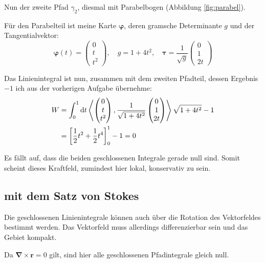 \documentclass[11pt, ngerman]{article}
\newcommand{\half}{\frac 12}
\newcommand{\inner}[2]{\left\langle #1, #2 \right\rangle}
\newcommand{\vnabla}{\vec \nabla}
\renewcommand{\vec}[1]{\boldsymbol{#1}}
\begin{document}
	Nun der zweite Pfad $\gamma_2$, diesmal mit Parabelbogen (Abbildung \ref{fig:parabel}).

	Für den Parabelteil ist meine Karte $\vec\varphi$, deren gramsche
	Determinante $g$ und der Tangentialvektor:
	\[
		\vec\varphi(t) = \begin{pmatrix}
			0 \\ t \\ t^2
		\end{pmatrix}
		, \quad
		g = 1 + 4t^2
		, \quad
		\vec \tau = \frac 1{\sqrt{g}} \begin{pmatrix}
			0 \\ 1 \\ 2t
		\end{pmatrix}
	\]

	Das Linienintegral ist nun, zusammen mit dem zweiten Pfadteil, dessen Ergebnis $-1$ ich aus der vorherigen Aufgabe übernehme:
	\begin{align*}
		W
		&= \int_0^1 \dif t \inner{\begin{pmatrix}
		0 \\ t \\ t^2
\end{pmatrix}}{\frac 1{\sqrt{1+4t^2}} \begin{pmatrix}
		0 \\ 1 \\ 2t
\end{pmatrix}} \sqrt{1+4t^2} - 1 \\
&= \sbr{\half t^2 + \half t^4}_0^1 - 1 = 0
\end{align*}

Es fällt auf, dass die beiden geschlossenen Integrale gerade null sind. Somit scheint dieses Kraftfeld, zumindest hier lokal, konservativ zu sein.

\subsection{mit dem Satz von Stokes}

Die geschlossenen Linienintegrale können auch über die Rotation des
Vektorfeldes bestimmt werden. Das Vektorfeld muss allerdings differenzierbar
sein und das Gebiet kompakt.

Da $\vnabla \times \vec r = 0$ gilt, sind hier alle geschlossenen Pfadintegrale
gleich null.

\end{document}
